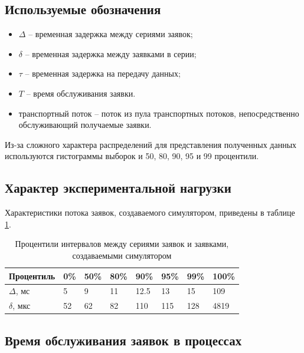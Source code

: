 \subsection{Используемые обозначения}

\begin{itemize}
\item $\Delta$ -- временная задержка между сериями заявок;
\item $\delta$ -- временная задержка между заявками в серии;
\item $\tau$ -- временная задержка на передачу данных;
\item $T$ -- время обслуживания заявки.
\item транспортный поток -- поток из пула транспортных потоков, непосредственно обслуживающий получаемые заявки.
\end{itemize}

Из-за сложного характера распределений для представления полученных данных используются гистограммы выборок и 50, 80, 90, 95 и 99 процентили.

\subsection{Характер экспериментальной нагрузки}

Характеристики потока заявок, создаваемого симулятором, приведены в таблице \ref{chapter41:TableSimulator}.
\begin{table}[!h]
\caption{Процентили интервалов между сериями заявок и заявками, создаваемыми симулятором}\label{chapter41:TableSimulator}
\centering
\begin{tabular}{|l|l|l|l|l|l|l|l|}
\hline
Процентиль & 0\% & 50\% & 80\% & 90\% & 95\% & 99\% & 100\% \\ \hline
$\Delta$, мс & 5 & 9 & 11 & 12.5 & 13 & 15 & 109 \\ \hline
$\delta$, мкс & 52 & 62 & 82 & 110 & 115 & 128 & 4819 \\ \hline
\end{tabular}
\end{table}

\subsection{Время обслуживания заявок в процессах}

